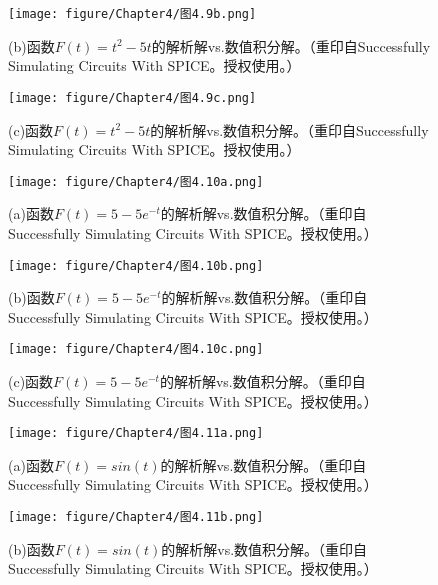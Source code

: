 \begin{figure}[htbp]
\small
    \centering
    \texttt{[image: figure/Chapter4/图4.9b.png]}
    \caption{(b)函数$F(t)=t^2-5t$的解析解vs.数值积分解。（重印自Successfully Simulating Circuits With SPICE。授权使用。）}
    \label{图4.9b}
\end{figure}

\begin{figure}[htbp]
\small
    \centering
    \texttt{[image: figure/Chapter4/图4.9c.png]}
    \caption{(c)函数$F(t)=t^2-5t$的解析解vs.数值积分解。（重印自Successfully Simulating Circuits With SPICE。授权使用。）}
    \label{图4.9c}
\end{figure}


\begin{figure}[htbp]
\small
    \centering
    \texttt{[image: figure/Chapter4/图4.10a.png]}
    \caption{(a)函数$F(t)=5-5e^{-t}$的解析解vs.数值积分解。（重印自Successfully Simulating Circuits With SPICE。授权使用。）}
    \label{图4.10a}
\end{figure}

\begin{figure}[htbp]
\small
    \centering
    \texttt{[image: figure/Chapter4/图4.10b.png]}
    \caption{(b)函数$F(t)=5-5e^{-t}$的解析解vs.数值积分解。（重印自Successfully Simulating Circuits With SPICE。授权使用。）}
    \label{图4.10b}
\end{figure}

\begin{figure}[htbp]
\small
    \centering
    \texttt{[image: figure/Chapter4/图4.10c.png]}
    \caption{(c)函数$F(t)=5-5e^{-t}$的解析解vs.数值积分解。（重印自Successfully Simulating Circuits With SPICE。授权使用。）}
    \label{图4.10c}
\end{figure}


\begin{figure}[htbp]
\small
    \centering
    \texttt{[image: figure/Chapter4/图4.11a.png]}
    \caption{(a)函数$F(t)=sin(t)$的解析解vs.数值积分解。（重印自Successfully Simulating Circuits With SPICE。授权使用。）}
    \label{图4.11a}
\end{figure}

\begin{figure}[htbp]
\small
    \centering
    \texttt{[image: figure/Chapter4/图4.11b.png]}
    \caption{(b)函数$F(t)=sin(t)$的解析解vs.数值积分解。（重印自Successfully Simulating Circuits With SPICE。授权使用。）}
    \label{图4.11b}
\end{figure}

